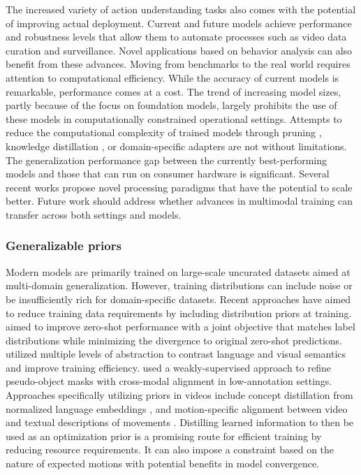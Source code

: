 The increased variety of action understanding tasks also comes with the potential of improving actual deployment. Current and future models achieve performance and robustness levels that allow them to automate processes such as video data curation and surveillance. Novel applications based on behavior analysis can also benefit from these advances. Moving from benchmarks to the real world requires attention to computational efficiency. While the accuracy of current models is remarkable, performance comes at a cost. The trend of increasing model sizes, partly because of the focus on foundation models, largely prohibits the use of these models in computationally constrained operational settings. Attempts to reduce the computational complexity of trained models through pruning , knowledge distillation , or domain-specific adapters  are not without limitations. The generalization performance gap between the currently best-performing models and those that can run on consumer hardware is significant. Several recent works  propose novel processing paradigms that have the potential to scale better. Future work should address whether advances in multimodal training can transfer across both settings and models.


\subsubsection{Generalizable priors}
\label{sec:directions::efficiency:::priors}

Modern models are primarily trained on large-scale uncurated datasets aimed at multi-domain generalization. However, training distributions can include noise or be insufficiently rich for domain-specific datasets. Recent approaches have aimed to reduce training data requirements by including distribution priors at training.  aimed to improve zero-shot performance with a joint objective that matches label distributions while minimizing the divergence to original zero-shot predictions.  utilized multiple levels of abstraction to contrast language and visual semantics and improve training efficiency.  used a weakly-supervised approach to refine pseudo-object masks with cross-modal alignment in low-annotation settings. Approaches specifically utilizing priors in videos include concept distillation from normalized language embeddings , and motion-specific alignment between video and textual descriptions of movements . Distilling learned information to then be used as an optimization prior is a promising route for efficient training by reducing resource requirements. It can also impose a constraint based on the nature of expected motions with potential benefits in model convergence.


